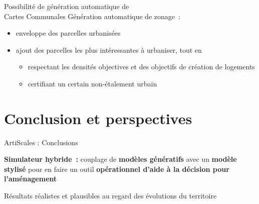 \documentclass[xcolor=table]{beamer}
\begin{document}
\begin{frame}{Possibilité de génération automatique de \\Cartes Communales}
Génération automatique de zonage~:
\begin{itemize}
	\small
	\item<2-> enveloppe des parcelles urbanisées
	\item<3-> ajout des parcelles les plus intéressantes à urbaniser, tout en 
	\begin{itemize}
			\item<4-> respectant les densités objectives et des objectifs de création de logements
			\item<5-> certifiant un certain non-étalement urbain
	\end{itemize} %
\end{itemize}
\end{frame}




\section{Conclusion et perspectives}

\begin{frame}{ArtiScales : Conclusions}
	\begin{block}{}
		\textbf{Simulateur hybride~:} couplage de \textbf{modèles génératifs} avec un \textbf{modèle stylisé} pour en faire un outil \textbf{opérationnel d'aide à la décision pour l'aménagement}
	\end{block}
	\begin{block}{}
		Résultats réalistes et plausibles au regard des évolutions du territoire
	\end{block}
\end{frame}
\end{document}
